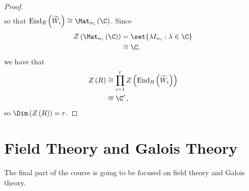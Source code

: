 \documentclass[10pt]{mypackage}
\begin{document}
\begin{proof}
\begin{align*}
  \end{align*}
  so that $\operatorname{End}_R\left( \widetilde{W}_i \right)\cong \Mat_{n_i}\left( \C \right)$. Since
  \begin{align*}
    Z\left( \Mat_{n_i}\left( \C \right) \right) &= \set{\lambda I_{n_i} : \lambda\in \C}\\
                                                &\cong \C,
  \end{align*}
  we have that
  \begin{align*}
    Z\left( R \right) &\cong \prod_{i=1}^{r} Z\left( \operatorname{End}_R\left( \widetilde{W}_i \right) \right)\\
                      &\cong \C^{r},
  \end{align*}
  so $\Dim\left( Z\left( R \right) \right) = r$.
\end{proof}
\section{Field Theory and Galois Theory}%
The final part of the course is going to be focused on field theory and Galois theory.
\end{document}
